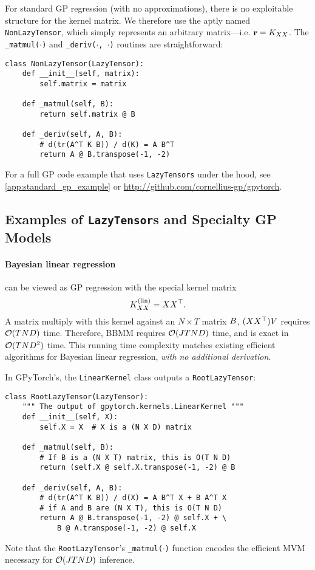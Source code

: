 For standard GP regression (with no approximations), there is no exploitable structure for the kernel matrix.
We therefore use the aptly named {\tt NonLazyTensor}, which simply represents an arbitrary matrix---i.e. $\mathbf{r} = K_{XX}$.
The {\tt \_matmul($\cdot$)} and {\tt \_deriv($\cdot$, $\cdot$)} routines are straightforward:
%
\begin{verbatim}
class NonLazyTensor(LazyTensor):
    def __init__(self, matrix):
        self.matrix = matrix

    def _matmul(self, B):
        return self.matrix @ B

    def _deriv(self, A, B):
        # d(tr(A^T K B)) / d(K) = A B^T
        return A @ B.transpose(-1, -2)
\end{verbatim}
%
\noindent
For a full GP code example that uses {\tt LazyTensors} under the hood, see \cref{app:standard_gp_example} or \url{http://github.com/cornellius-gp/gpytorch}.


\subsection{Examples of {\tt LazyTensor}s and Specialty GP Models}
\paragraph{Bayesian linear regression} can be viewed as GP regression with the special kernel matrix
\[
  K_{XX}^{(\text{lin})} = XX^{\top}.
\]
A matrix multiply with this kernel against an $N \times T$ matrix $B$, $(XX^{\top})V$ requires $\bigo{TND}$ time.
Therefore, BBMM requires $\bigo{JTND}$ time, and is exact in $\bigo{TND^2}$ time.
This running time complexity matches existing efficient algorithms for Bayesian linear regression, \emph{with no additional derivation}.

In GPyTorch's, the {\tt LinearKernel} class outputs a {\tt RootLazyTensor}:
%
\begin{verbatim}
class RootLazyTensor(LazyTensor):
    """ The output of gpytorch.kernels.LinearKernel """
    def __init__(self, X):
        self.X = X  # X is a (N X D) matrix

    def _matmul(self, B):
        # If B is a (N X T) matrix, this is O(T N D)
        return (self.X @ self.X.transpose(-1, -2) @ B

    def _deriv(self, A, B):
        # d(tr(A^T K B)) / d(X) = A B^T X + B A^T X
        # if A and B are (N X T), this is O(T N D)
        return A @ B.transpose(-1, -2) @ self.X + \
            B @ A.transpose(-1, -2) @ self.X
\end{verbatim}
%
\noindent
Note that the {\tt RootLazyTensor}'s {\tt \_matmul($\cdot$)} function encodes the efficient MVM necessary for $\bigo{JTND}$ inference.

